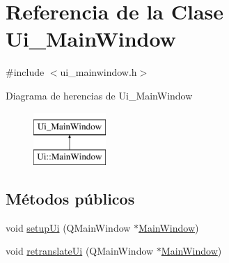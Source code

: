 \hypertarget{class_ui___main_window}{}\section{Referencia de la Clase Ui\+\_\+\+Main\+Window}
\label{class_ui___main_window}


{\ttfamily \#include $<$ui\+\_\+mainwindow.\+h$>$}

Diagrama de herencias de Ui\+\_\+\+Main\+Window\begin{figure}[H]
\begin{center}
\leavevmode
\includegraphics[height=2.000000cm]{class_ui___main_window}
\end{center}
\end{figure}
\subsection*{Métodos públicos}
\begin{DoxyCompactItemize}
\item 
void \hyperlink{class_ui___main_window_acf4a0872c4c77d8f43a2ec66ed849b58}{setup\+Ui} (Q\+Main\+Window $\ast$\hyperlink{class_main_window}{Main\+Window})
\item 
void \hyperlink{class_ui___main_window_a097dd160c3534a204904cb374412c618}{retranslate\+Ui} (Q\+Main\+Window $\ast$\hyperlink{class_main_window}{Main\+Window})
\end{DoxyCompactItemize}
